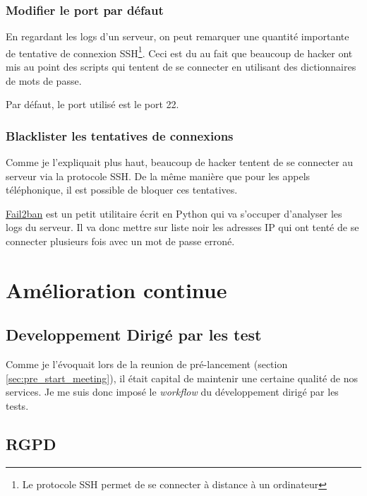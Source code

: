 \documentclass[]{report}
\begin{document}
    \subsection{Modifier le port par défaut}\label{subsec:change_ports}

      En regardant les logs d'un serveur, on peut remarquer une quantité importante de tentative de connexion SSH\footnote{Le protocole SSH permet de se connecter à distance à un ordinateur}. Ceci est du au fait que beaucoup de hacker ont mis au point des scripts qui tentent de se connecter en utilisant des dictionnaires de mots de passe.

      Par défaut, le port utilisé est le port 22.


    \subsection{Blacklister les tentatives de connexions}

      Comme je l'expliquait plus haut, beaucoup de hacker tentent de se connecter au serveur via la protocole SSH. De la même manière que pour les appels téléphonique, il est possible de bloquer ces tentatives.

       \href{https://www.fail2ban.org/wiki/index.php/Main_Page}{Fail2ban} est un petit utilitaire écrit en Python qui va s’occuper d'analyser les logs du serveur. Il va donc mettre sur liste noir les adresses IP qui ont tenté de se connecter plusieurs fois avec un mot de passe erroné.

\chapter{Amélioration continue}

  \section{Developpement Dirigé par les test}

    Comme je l'évoquait lors de la reunion de pré-lancement (section \ref{sec:pre_start_meeting}), il était capital de maintenir une certaine qualité de nos services. Je me suis donc imposé le \textit{workflow} du développement dirigé par les tests.




  \section{RGPD}
\end{document}
